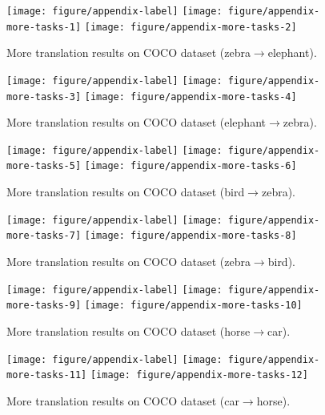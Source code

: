 \documentclass{article} \usepackage{iclr2019_conference,times}
\begin{document}
\newpage
\begin{figure}[H]
	\centering
	\texttt{[image: figure/appendix-label]}
	\texttt{[image: figure/appendix-more-tasks-1]}
    \texttt{[image: figure/appendix-more-tasks-2]}
	\caption{
	More translation results on COCO dataset (zebra$\to$elephant).
	} \label{fig:more-tasks-1}
\end{figure}

\begin{figure}[H]
	\centering
	\texttt{[image: figure/appendix-label]}
	\texttt{[image: figure/appendix-more-tasks-3]}
    \texttt{[image: figure/appendix-more-tasks-4]}
	\caption{
	More translation results on COCO dataset (elephant$\to$zebra).
	} \label{fig:more-tasks-2}
\end{figure}

\begin{figure}[H]
	\centering
	\texttt{[image: figure/appendix-label]}
	\texttt{[image: figure/appendix-more-tasks-5]}
    \texttt{[image: figure/appendix-more-tasks-6]}
	\caption{
	More translation results on COCO dataset (bird$\to$zebra).
	} \label{fig:more-tasks-3}
\end{figure}

\newpage
\begin{figure}[H]
	\centering
	\texttt{[image: figure/appendix-label]}
	\texttt{[image: figure/appendix-more-tasks-7]}
    \texttt{[image: figure/appendix-more-tasks-8]}
	\caption{
	More translation results on COCO dataset (zebra$\to$bird).
	} \label{fig:more-tasks-4}
\end{figure}

\begin{figure}[H]
	\centering
	\texttt{[image: figure/appendix-label]}
	\texttt{[image: figure/appendix-more-tasks-9]}
    \texttt{[image: figure/appendix-more-tasks-10]}
	\caption{
	More translation results on COCO dataset (horse$\to$car).
	} \label{fig:more-tasks-5}
\end{figure}

\begin{figure}[H]
	\centering
	\texttt{[image: figure/appendix-label]}
	\texttt{[image: figure/appendix-more-tasks-11]}
    \texttt{[image: figure/appendix-more-tasks-12]}
	\caption{
	More translation results on COCO dataset (car$\to$horse).
	} \label{fig:more-tasks-6}
\end{figure}
\end{document}
